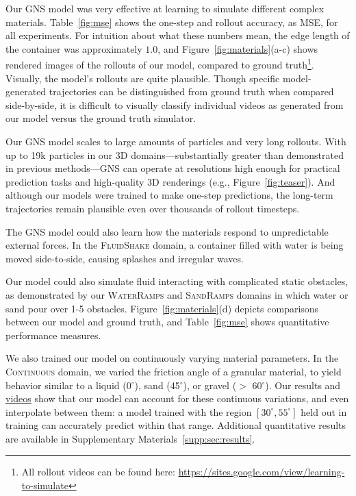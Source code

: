 \documentclass{article}
\newcommand\figref[1]{Figure~\ref{#1}}
\newcommand\tabref[1]{Table~\ref{#1}}
\newcommand\domain[1]{\textsc{#1}}
\newcommand\vidcont[1]{\href{http://tny.sh/lLvCAc5}{#1}}
\begin{document}
Our GNS model was very effective at learning to simulate different complex materials.
Table~\ref{fig:mse} shows the one-step and rollout accuracy, as MSE, for all experiments. For intuition about what these numbers mean, the edge length of the container was approximately $1.0$, and \figref{fig:materials}(a-c)
%
shows rendered images of the rollouts of our model, compared to ground truth\footnote{All rollout videos can be found here: \url{https://sites.google.com/view/learning-to-simulate}}. Visually, the model's rollouts are quite plausible. Though specific model-generated trajectories can be distinguished from ground truth when compared side-by-side, it is difficult to visually classify individual videos as generated from our model versus the ground truth simulator. 

Our GNS model scales to large amounts of particles and very long rollouts. With up to 19k particles in our 3D domains---substantially greater than demonstrated in previous methods---GNS can operate at resolutions high enough for practical prediction tasks and high-quality 3D renderings (e.g., \figref{fig:teaser}). And although our models were trained to make one-step predictions, the long-term trajectories remain plausible even over thousands of rollout timesteps. %

The GNS model could also learn how the materials respond to unpredictable external forces. In the \domain{FluidShake} domain, a container filled with water is being moved side-to-side, causing splashes and irregular waves. 

Our model could also simulate fluid interacting with complicated static obstacles, as demonstrated by our \domain{WaterRamps} and \domain{SandRamps} domains in which water or sand pour over 1-5 obstacles. \figref{fig:materials}(d) depicts comparisons between our model and ground truth, and \tabref{fig:mse} shows quantitative performance measures. 
%

We also trained our model on continuously varying material parameters. In the \domain{Continuous} domain, we varied the friction angle of a granular material, to yield behavior similar to a liquid (0$^{\circ}$), sand (45$^{\circ}$), or gravel ($>$ 60$^{\circ}$). Our results and \vidcont{videos} show that our model can account for these continuous variations, and even interpolate between them: a model trained with the region $[30^{\circ}, 55^{\circ}]$ held out in training can accurately predict within that range. Additional quantitative results are available in Supplementary Materials~\ref{supp:sec:results}.
\end{document}
